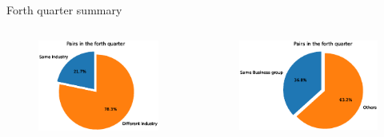 \documentclass{beamer}
\begin{document}
			\begin{frame}{Forth quarter summary}\label{Monthly22}
		
\begin{columns}
	\begin{figure}   
		\centering
		\includegraphics[width=\linewidth]{"sameIndustryinQuarter.eps"}     \end{figure}            
	\begin{figure}
		\centering  
		\includegraphics[width=\linewidth]{"sameIBGinQuarter.eps"}
	\end{figure}
\end{columns}
\centering
			
			
			
		\end{frame}
		
\end{document}
